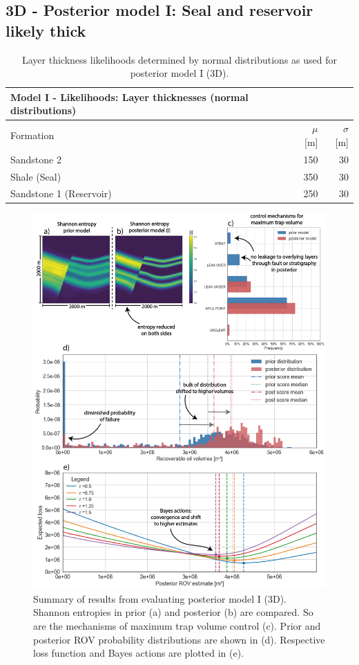		\subsection{3D - Posterior model I: Seal and reservoir likely thick}
		\begin{table}[h]
			\centering
			\begin{tabular}{lrr} 
				\toprule
				Model I - Likelihoods: Layer thicknesses (normal distributions)\\  
				\midrule 
				Formation & $\mu$ [m] & $\sigma$ [m]\\ 
				\midrule 
				Sandstone 2 & 150 & 30 \\
				Shale (Seal) & 350 & 30\\ 
				Sandstone 1 (Reservoir) & 250 & 30 \\
				\bottomrule
			\end{tabular}
			\caption{Layer thickness likelihoods determined by normal distributions as used for posterior model I (3D).}
			\label{tab:ML1_likelihoods}
		\end{table}
		\begin{figure}[p!]
			\centering
			\includegraphics[width=1\textwidth]{Figures/ML1}
			\caption{Summary of results from evaluating posterior model I (3D). Shannon entropies in prior (a) and posterior (b) are compared. So are the mechanisms of maximum trap volume control (c). Prior and posterior ROV probability distributions are shown in (d). Respective loss function and Bayes actions are plotted in (e).}\label{fig:ML1}
		\end{figure}		
